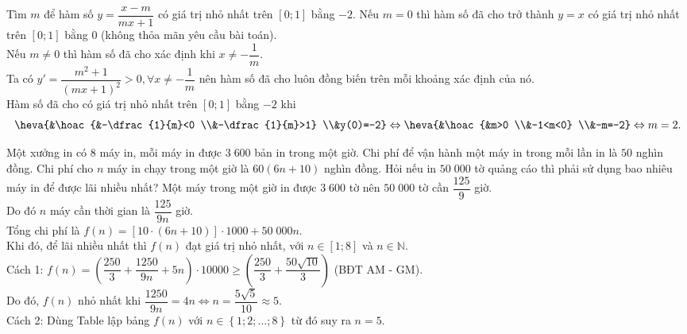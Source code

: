 \begin{ex}%
	Tìm $m$ để hàm số $y=\dfrac{x-m}{mx+1}$ có giá trị nhỏ nhất trên $[0;1]$ bằng $-2$.
	\loigiai
	{
		Nếu $m=0$ thì hàm số đã cho trở thành $y=x$ có giá trị nhỏ nhất trên $[0;1]$ bằng $0$ (không thỏa mãn yêu cầu bài toán).\\
		Nếu $m \neq 0$ thì hàm số đã cho xác định khi $x\neq -\dfrac{1}{m}$.\\
		Ta có $y'=\dfrac{m^2+1}{(mx+1)^2}>0, \forall x \neq -\dfrac{1}{m}$ nên hàm số đã cho luôn đồng biến trên mỗi khoảng xác định của nó.\\
		Hàm số đã cho có giá trị nhỏ nhất trên $[0;1]$ bằng $-2$ khi
		\[\heva{&\hoac{&-\dfrac{1}{m}<0 \\&-\dfrac{1}{m}>1} \\&y(0)=-2} \Leftrightarrow \heva{&\hoac{&m>0 \\&-1<m<0} \\&-m=-2} \Leftrightarrow m=2.\]
	}
\end{ex}
\begin{ex}%
	Một xưởng in có $8$ máy in, mỗi máy in được $3\;600$ bản in trong một giờ. Chi phí để vận hành một máy in trong mỗi lần in là $50$ nghìn đồng. Chi phí cho $n$ máy in chạy trong một giờ là $60(6n+10)$ nghìn đồng. Hỏi nếu in $50\;000$ tờ quảng cáo thì phải sử dụng bao nhiêu máy in để được lãi nhiều nhất?	
	\loigiai
	{Một máy trong một giờ in được $3\;600$ tờ nên $50\;000$ tờ cần $\dfrac{125}{9}$ giờ.\\
		Do đó $n$ máy cần thời gian là $\dfrac{125}{9n}$ giờ.\\
		Tổng chi phí là $f(n)=\left[10\cdot \left(6n+10\right)\right]\cdot 1000+50\;000n$.\\
		Khi đó, để lãi nhiều nhất thì $f(n)$ đạt giá trị nhỏ nhất, với $n\in \left[1;8\right]$ và $n\in \mathbb{N}$.\\
		Cách 1: $f(n)=\left(\dfrac{250}{3}+\dfrac{1250}{9n}+5n\right)\cdot 10000\geq \left(\dfrac{250}{3}+\dfrac{50\sqrt{10}}{3}\right)$ (BĐT AM - GM).\\
		Do đó, $f(n)$ nhỏ nhất khi $\dfrac{1250}{9n}=4n\Leftrightarrow n =\dfrac{5\sqrt{5}}{10}\approx 5$.\\
		Cách 2: Dùng Table lập bảng $f(n)$ với $n\in \left\{1; 2; \ldots ; 8\right\}$ từ đó suy ra $n=5$.  
	}
\end{ex}
